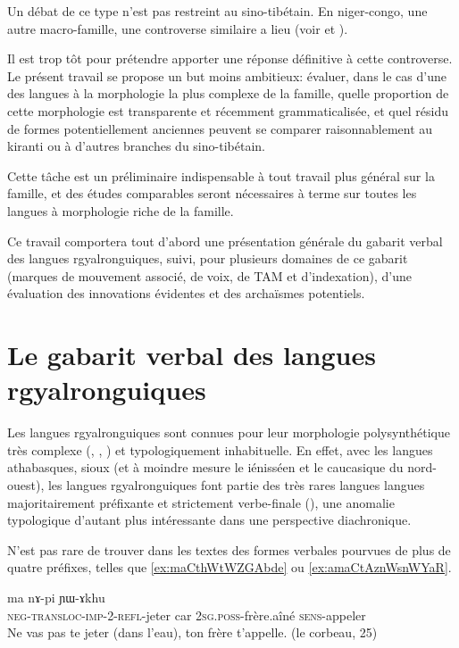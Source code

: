 \documentclass[oldfontcommands,oneside,a4paper,11pt]{article}
\newcommand{\ipa}[1]{{\phon \mbox{#1}}} %
\begin{document}
Un débat de ce type n'est pas restreint au sino-tibétain. En niger-congo, une autre macro-famille, une controverse similaire a lieu (voir  \citealt{guldeman08macrosudan} et  \citealt{hyman11macrosudan}). 

Il est trop tôt pour prétendre apporter une réponse définitive à cette controverse. Le présent travail se propose un but moins ambitieux: évaluer, dans le cas d'une des langues à la morphologie la plus complexe de la famille, quelle proportion de cette morphologie est transparente et récemment grammaticalisée, et quel résidu de formes potentiellement anciennes peuvent se comparer raisonnablement au kiranti ou à d'autres branches du sino-tibétain. 

Cette tâche est un préliminaire indispensable à tout travail plus général sur la famille, et des études comparables seront nécessaires à terme  sur toutes les langues à morphologie riche de la famille.


Ce travail comportera tout d'abord une présentation générale du gabarit verbal des langues rgyalronguiques, suivi, pour plusieurs domaines de ce gabarit (marques de mouvement associé, de voix, de TAM et d'indexation), d'une évaluation des innovations évidentes et des archaïsmes potentiels.

\section{Le gabarit verbal des langues rgyalronguiques}
Les langues rgyalronguiques sont connues pour leur morphologie polysynthétique très complexe (\citealt{jacques12incorp}, \citealt{lai13affixale}, \citealt{jackson14morpho}) et typologiquement inhabituelle. En effet, avec les langues athabasques, sioux (et à moindre mesure le iénisséen  et le caucasique du nord-ouest), les langues rgyalronguiques font partie des très rares langues langues majoritairement préfixante et strictement verbe-finale (\citealt{jacques13harmonization}), une anomalie typologique d'autant plus intéressante dans une perspective diachronique.
 
N'est pas rare de trouver dans les textes des formes verbales pourvues de plus de quatre préfixes, telles que \ref{ex:maCthWtWZGAbde} ou \ref{ex:amaCtAznWsnWYaR}. 


\begin{exe}
\ex \label{ex:maCthWtWZGAbde}
\gll \ipa{ma-ɕ-thɯ-tɯ-ʑɣɤ-βde}  	\ipa{ma}  	\ipa{nɤ-pi}  	\ipa{ɲɯ-ɤkhu}  \\
\textsc{neg-transloc-imp-2-refl}-jeter car \textsc{2sg.poss}-frère.aîné \textsc{sens}-appeler \\
\glt Ne vas pas te jeter (dans l'eau), ton frère t'appelle. (le corbeau, 25)
\end{exe}
\end{document}
